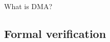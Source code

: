 \documentclass[xcolor={x11names}]{beamer}
\begin{document}
\begin{frame}{What is DMA?}
    \begin{center}
        \begin{figure}
            \label{dma-dangers-1}
        \end{figure}
    \end{center}
\end{frame}


\subsection{Formal verification}
\end{document}
